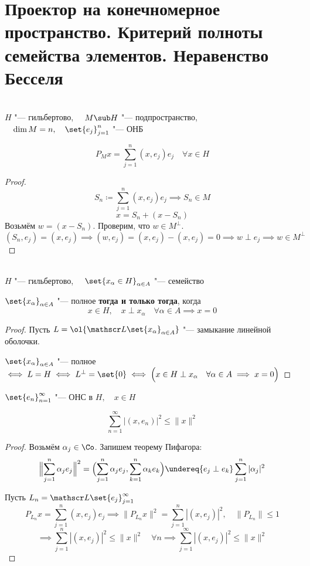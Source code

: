 \section{Проектор на конечномерное пространство.
Критерий полноты семейства элементов.
Неравенство Бесселя}

\begin{implication}
	\hfill \\
	$ H $ "--- гильбертово, $ \quad M \sub H $ "--- подпространство, $ \quad \dim M = n, \quad
	\set{e_j}_{j = 1}^n $ "--- ОНБ

	$$ P_Mx = \sum_{j = 1}^n (x, e_j)e_j \quad \forall x \in H $$
\end{implication}

\begin{proof}
	$$ S_n \coloneq \sum_{j = 1}^n (x, e_j)e_j \implies S_n \in M $$
	$$ x = S_n + (x - S_n) $$
	Возьмём $ w = (x - S_n) $.
	Проверим, что $ w \in M^\perp $.
	$$ (S_n, e_j) = (x, e_j) \implies (w, e_j) = (x, e_j) - (x, e_j) = 0 \implies
	w \perp e_j \implies w \in M^\perp $$
\end{proof}

\begin{implication}
	\hfill \\
	$ H $ "--- гильбертово, $ \quad \set{x_\alpha \in H}_{\alpha \in A} $ "--- семейство

	$ \set{x_\alpha}_{\alpha \in A} $ "--- полное \textbf{тогда и только тогда}, когда
	$$ x \in H, \quad x \perp x_\alpha \quad \forall \alpha \in A \implies x = 0 $$
\end{implication}

\begin{proof}
	Пусть $ L = \ol{\mathscr L\set{x_\alpha}_{\alpha \in A}} $ "--- замыкание линейной оболочки.

	$ \set{x_\alpha}_{\alpha \in A} $ "--- полное $ \iff L = H \iff L^\perp = \set{0} \iff
	\Bigl( x \in H \perp x_\alpha \quad \forall \alpha \in A \implies x = 0 \Bigr) $
\end{proof}

\begin{implication}
	$ \set{e_n}_{n = 1}^\infty $ "--- ОНС в $ H, \quad x \in H $

	$$ \sum_{n = 1}^\infty |(x, e_n)|^2 \le \|x\|^2 $$
\end{implication}

\begin{proof}
	Возьмём $ \alpha_j \in \Co $.
	Запишем теорему Пифагора:
	$$ \Bigl\| \sum_{j = 1}^n \alpha_j e_j \Bigr\|^2 =
	\Bigl( \sum_{j = 1}^n \alpha_j e_j, \sum_{k = 1}^n \alpha_k e_k \Bigr) \undereq{e_j \perp e_k}
	\sum_{j = 1}^n |\alpha_j|^2 $$

	Пусть $ L_n = \mathscr L \set{e_j}_{j = 1}^\infty $
	$$ P_{L_n}x = \sum_{j = 1}^n (x, e_j)e_j \implies
	\|P_{L_n}x\|^2 = \sum_{j = 1}^n |(x, e_j)|^2, \quad \|P_{L_n}\| \le 1 $$
	$$ \implies \sum_{j = 1}^n |(x, e_j)|^2 \le \|x\|^2 \quad \forall n \implies
	\sum_{j = 1}^\infty |(x, e_j)|^2 \le \|x\|^2 $$
\end{proof}
